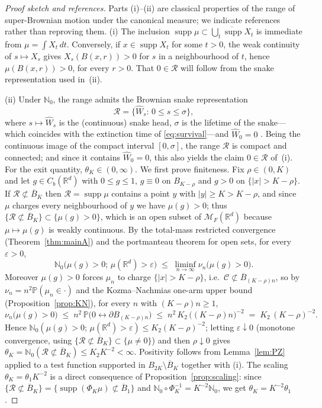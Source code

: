\documentclass[11pt]{article}
\theoremstyle{definition}
\theoremstyle{remark}
\newcommand{\R}{\mathbb{R}}
\newcommand{\bP}{\mathbb{P}}
\newcommand{\bN}{{\mathbb{N}_0}}                 %
\newcommand{\cM}{{\mathcal{M}_F(\R^d)}}          %
\newcommand{\supp}{\operatorname{supp}}
\newcommand{\Ran}{\mathcal{R}}                 %
\newcommand{\eps}{\varepsilon}
\numberwithin{equation}{section}
\theoremstyle{plain}
\theoremstyle{definition}
\theoremstyle{remark}
\theoremstyle{plain}
\begin{document}
\begin{proof}[Proof sketch and references]
Parts (i)--(ii) are classical properties of the
range of super-Brownian motion under the canonical measure; we indicate
references rather than reproving them.
(i) The inclusion $\supp\mu\subset\overline{\bigcup_t\supp X_t}$ is
immediate from $\mu=\int X_t\,dt$. Conversely, if $x\in\supp X_t$ for some
$t>0$, the weak continuity of $s\mapsto X_s$ gives $X_s(B(x,r))>0$ for $s$
in a neighbourhood of $t$, hence $\mu(B(x,r))>0$, for every $r>0$. That $0\in\Ran$ will follow from the snake representation used in~(ii).

(ii) Under $\bN$, the range admits the Brownian snake representation
\[
\Ran=\{\hat W_s:\,0\le s\le\sigma\},
\]
where $s\mapsto\hat W_s$ is the (continuous) snake head, $\sigma$ is the lifetime of the snake---which coincides with the extinction time of \eqref{eq:survival}---and $\hat W_0=0$ \cite[Ch.~IV.5, display~(a)]{LG99}. Being the continuous image of the compact interval $[0,\sigma]$, the range $\Ran$ is compact and connected; and since it contains $\hat W_0=0$, this also yields the claim $0\in\Ran$ of~(i).
For the exit quantity, $\theta_K\in(0,\infty)$. We first prove finiteness. Fix
$\rho\in(0,K)$ and let $g\in C_b(\R^d)$ with $0\le g\le1$, $g\equiv0$ on
$B_{K-\rho}$ and $g>0$ on $\{|x|>K-\rho\}$. If $\Ran\not\subset\overline B_K$ then
$\Ran=\supp\mu$ contains a point $y$ with $|y|\ge K>K-\rho$, and since $\mu$
charges every neighbourhood of $y$ we have $\mu(g)>0$; thus
$\{\Ran\not\subset\overline B_K\}\subset\{\mu(g)>0\}$, which is an open subset of $\cM$
because $\mu\mapsto\mu(g)$ is weakly continuous. By the total-mass restricted
convergence (Theorem~\ref{thm:mainA}) and the portmanteau theorem for open
sets, for every $\eps>0$,
\[
  \bN\bigl(\mu(g)>0;\,\mu(\R^d)>\eps\bigr)
  \;\le\;\liminf_{n\to\infty}\nu_n\bigl(\mu(g)>0\bigr).
\]
Moreover $\mu(g)>0$ forces $\mu_n$ to charge $\{|x|>K-\rho\}$, i.e.\
$\mathcal C\not\subset\overline B_{(K-\rho)n}$, so by $\nu_n=n^2\bP(\mu_n\in\cdot)$ and the
Kozma--Nachmias one-arm upper bound (Proposition~\ref{prop:KN}), for every $n$
with $(K-\rho)n\ge1$,
\[
  \nu_n\bigl(\mu(g)>0\bigr)
  \;\le\;n^2\,\bP\bigl(0\leftrightarrow\partial B_{(K-\rho)n}\bigr)
  \;\le\;n^2\,K_2\,\bigl((K-\rho)n\bigr)^{-2}
  \;=\;K_2\,(K-\rho)^{-2}.
\]
Hence $\bN(\mu(g)>0;\,\mu(\R^d)>\eps)\le K_2(K-\rho)^{-2}$; letting
$\eps\downarrow0$ (monotone convergence, using
$\{\Ran\not\subset\overline B_K\}\subset\{\mu\ne0\}$) and then $\rho\downarrow0$ gives
$\theta_K=\bN(\Ran\not\subset\overline B_K)\le K_2K^{-2}<\infty$. Positivity follows from
Lemma~\ref{lem:PZ} applied to a test function supported in
$B_{2K}\setminus\overline B_K$ together with (i).
 The scaling
$\theta_K=\theta_1K^{-2}$ is a direct consequence of
Proposition~\ref{prop:scaling}: since
$\{\Ran\not\subset\overline B_K\}=\{\supp(\Phi_K\mu)\not\subset\overline B_1\}$ and
$\bN\circ\Phi_K^{-1}=K^{-2}\bN$, we get $\theta_K=K^{-2}\theta_1$.
\end{proof}
\end{document}
